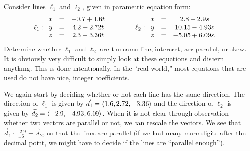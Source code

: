 \begin{example}\label{ex_lines3}%
Consider lines $\ell_1$ and $\ell_2$, given in parametric equation form:
\[
\ell_1: \begin{array}{ c c c } x&=&-0.7+1.6t \\ y&=&4.2+2.72t\\z&=&2.3-3.36t\end{array}
\qquad\qquad
\ell_2:\begin{array}{ c c c } x&=&2.8-2.9s\\y&=&10.15-4.93s\\z&=&-5.05+6.09s.\end{array}
\]
Determine whether $\ell_1$ and $\ell_2$ are the same line, intersect, are parallel, or skew.
\solution
It is obviously very difficult to simply look at these equations and discern anything. This is done intentionally. In the ``real world,'' most equations that are used do not have nice, integer coefficients.%

We again start by deciding whether or not each line has the same direction. The direction of $\ell_1$ is given by $\vec d_1 =\left\langle 1.6,2.72,-3.36\right\rangle$ and the direction of $\ell_2$ is given by $\vec d_2 =\left\langle -2.9,-4.93,6.09\right\rangle$. When it is not clear through observation whether two vectors are parallel or not,
%
we can rescale the vectors.  We see that $\vec d_1\cdot\frac{-2.9}{1.6}=\vec d_2$, so that the lines are parallel (if we had many more digits after the decimal point, we might have to decide if the lines are ``parallel enough'').


\end{example}
